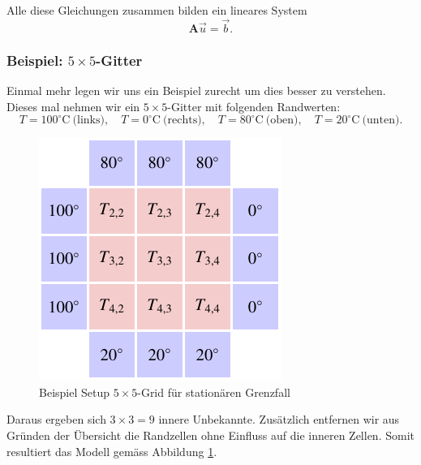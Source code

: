 Alle diese Gleichungen zusammen bilden ein lineares System
\[
\mathbf{A}\vec{u} = \vec{b}.
\]

\subsubsection{Beispiel: $5\times 5$-Gitter}

Einmal mehr legen wir uns ein Beispiel zurecht um dies besser zu verstehen. Dieses mal nehmen wir  ein $5\times 5$-Gitter mit folgenden Randwerten:
\[
T=100^\circ\mathrm{C}\ \text{(links)},\quad
T=0^\circ\mathrm{C}\ \text{(rechts)},\quad
T=80^\circ\mathrm{C}\ \text{(oben)},\quad
T=20^\circ\mathrm{C}\ \text{(unten)}.
\]

\begin{figure}[htbp]
	\centering
	\includegraphics{papers/parallelisierung/images/stationaer.pdf}
	\caption{Beispiel Setup $5\times5$-Grid für stationären Grenzfall}
	\label{parallelisierung:fig:stationaer}
\end{figure}
Daraus ergeben sich $3\times 3 = 9$ innere Unbekannte.
Zusätzlich entfernen wir aus Gründen der Übersicht die Randzellen ohne Einfluss auf die inneren Zellen. Somit resultiert das Modell gemäss Abbildung \ref{parallelisierung:fig:stationaer}.


